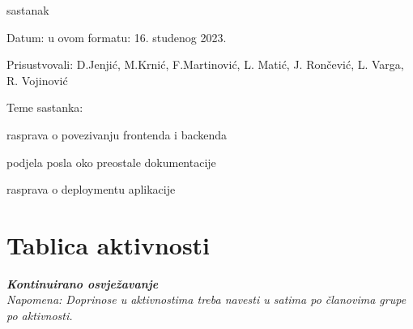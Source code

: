 \begin{packed_enum}
			
			\item  sastanak
			\item[] \begin{packed_item}
				\item Datum: u ovom formatu: 16. studenog 2023.
				\item Prisustvovali: D.Jenjić, M.Krnić, F.Martinović, L. Matić, J. Rončević, L. Varga, R. Vojinović
				\item Teme sastanka:
				\begin{packed_item}
					\item  rasprava o povezivanju frontenda i backenda
					\item  podjela posla oko preostale dokumentacije
					\item  rasprava o deploymentu aplikacije
				\end{packed_item}
			\end{packed_item}
			
			
			

			
		\end{packed_enum}
		
		\eject
		\section*{Tablica aktivnosti}
		
			\textbf{\textit{Kontinuirano osvježavanje}}\\
			
			 \textit{Napomena: Doprinose u aktivnostima treba navesti u satima po članovima grupe po aktivnosti.}

